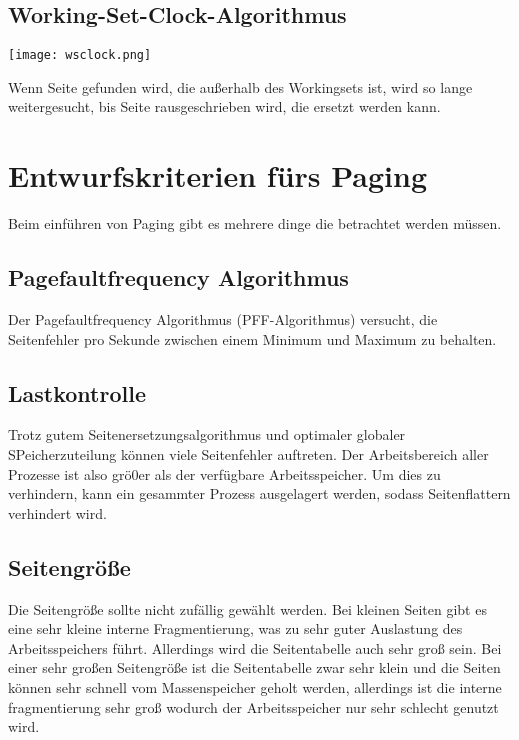 \subsection{Working-Set-Clock-Algorithmus}

\texttt{[image: wsclock.png]}

Wenn Seite gefunden wird, die außerhalb des Workingsets ist, wird so lange weitergesucht, bis Seite rausgeschrieben wird, die ersetzt werden kann.

\section{Entwurfskriterien fürs Paging}

Beim einführen von Paging gibt es mehrere dinge die betrachtet werden müssen.

\subsection{Pagefaultfrequency Algorithmus}

Der Pagefaultfrequency Algorithmus (PFF-Algorithmus) versucht, die Seitenfehler pro Sekunde zwischen einem Minimum und Maximum zu behalten. 

\subsection{Lastkontrolle}

Trotz gutem Seitenersetzungsalgorithmus und optimaler globaler SPeicherzuteilung können viele Seitenfehler auftreten. Der Arbeitsbereich aller Prozesse ist also grö0er als der verfügbare Arbeitsspeicher. Um dies zu verhindern, kann ein gesammter Prozess ausgelagert werden, sodass Seitenflattern verhindert wird.

\subsection{Seitengröße}

Die Seitengröße sollte nicht zufällig gewählt werden. Bei kleinen Seiten gibt es eine sehr kleine interne Fragmentierung, was zu sehr guter Auslastung des Arbeitsspeichers führt. Allerdings wird die Seitentabelle auch sehr groß sein. Bei einer sehr großen Seitengröße ist die Seitentabelle zwar sehr klein und die Seiten können sehr schnell vom Massenspeicher geholt werden, allerdings ist die interne fragmentierung sehr groß wodurch der Arbeitsspeicher nur sehr schlecht genutzt wird.

